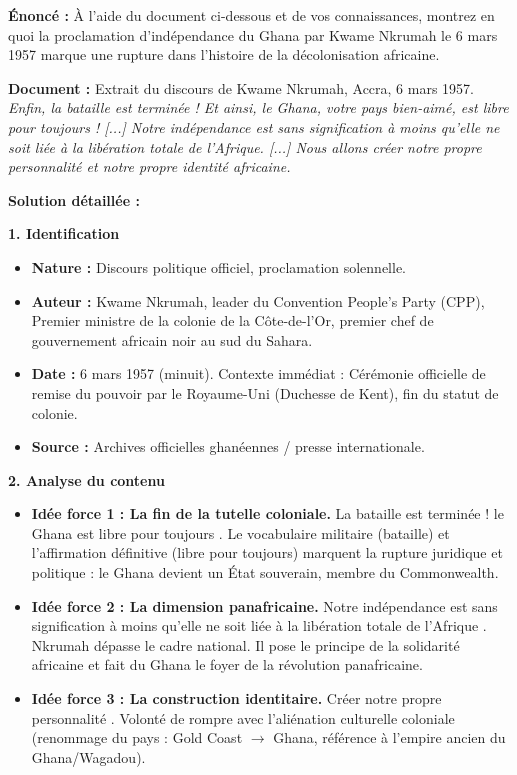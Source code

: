 \documentclass[11pt]{article}
\newcommand{\cle}[1]{{\popxbold\color{popdark}#1}}
\begin{document}
\begin{exoresolu}
\textbf{Énoncé :} À l'aide du document ci-dessous et de vos connaissances, montrez en quoi la proclamation d'indépendance du Ghana par Kwame Nkrumah le 6 mars 1957 marque une rupture dans l'histoire de la décolonisation africaine.

\textbf{Document :} Extrait du discours de Kwame Nkrumah, Accra, 6 mars 1957.
\guillemotleft \emph{Enfin, la bataille est terminée ! Et ainsi, le Ghana, votre pays bien-aimé, est libre pour toujours ! [...] Notre indépendance est sans signification à moins qu'elle ne soit liée à la libération totale de l'Afrique. [...] Nous allons créer notre propre personnalité et notre propre identité africaine.} \guillemotright

\tcblower
\textbf{Solution détaillée :}

\textbf{1. Identification}
\begin{itemize}
    \item \textbf{Nature :} Discours politique officiel, proclamation solennelle.
    \item \textbf{Auteur :} \cle{Kwame Nkrumah}, leader du \cle{Convention People's Party (CPP)}, Premier ministre de la colonie de la Côte-de-l'Or, premier chef de gouvernement africain noir au sud du Sahara.
    \item \textbf{Date :} 6 mars 1957 (minuit). Contexte immédiat : Cérémonie officielle de remise du pouvoir par le Royaume-Uni (Duchesse de Kent), fin du statut de colonie.
    \item \textbf{Source :} Archives officielles ghanéennes / presse internationale.
\end{itemize}

\textbf{2. Analyse du contenu}
\begin{itemize}
    \item \textbf{Idée force 1 : La fin de la tutelle coloniale.} \guillemotleft La bataille est terminée ! \guillemotright \guillemotleft le Ghana est libre pour toujours \guillemotright. Le vocabulaire militaire (\cle{bataille}) et l'affirmation définitive (\cle{libre pour toujours}) marquent la rupture juridique et politique : le Ghana devient un État souverain, membre du Commonwealth.
    \item \textbf{Idée force 2 : La dimension panafricaine.} \guillemotleft Notre indépendance est sans signification à moins qu'elle ne soit liée à la libération totale de l'Afrique \guillemotright. Nkrumah dépasse le cadre national. Il pose le principe de la \cle{solidarité africaine} et fait du Ghana le \cle{foyer de la révolution panafricaine}.
    \item \textbf{Idée force 3 : La construction identitaire.} \guillemotleft Créer notre propre personnalité \guillemotright. Volonté de rompre avec l'aliénation culturelle coloniale (renommage du pays : Gold Coast $\to$ Ghana, référence à l'empire ancien du Ghana/Wagadou).
\end{itemize}


\end{exoresolu}
\end{document}
